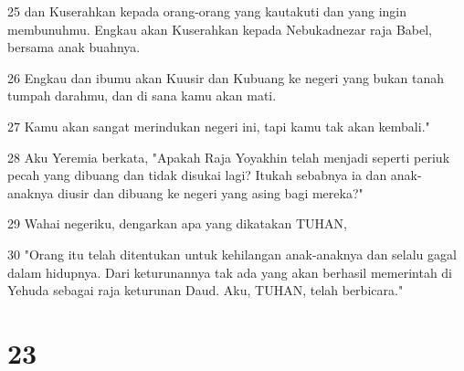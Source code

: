 \par 25 dan Kuserahkan kepada orang-orang yang kautakuti dan yang ingin membunuhmu. Engkau akan Kuserahkan kepada Nebukadnezar raja Babel, bersama anak buahnya.
\par 26 Engkau dan ibumu akan Kuusir dan Kubuang ke negeri yang bukan tanah tumpah darahmu, dan di sana kamu akan mati.
\par 27 Kamu akan sangat merindukan negeri ini, tapi kamu tak akan kembali."
\par 28 Aku Yeremia berkata, "Apakah Raja Yoyakhin telah menjadi seperti periuk pecah yang dibuang dan tidak disukai lagi? Itukah sebabnya ia dan anak-anaknya diusir dan dibuang ke negeri yang asing bagi mereka?"
\par 29 Wahai negeriku, dengarkan apa yang dikatakan TUHAN,
\par 30 "Orang itu telah ditentukan untuk kehilangan anak-anaknya dan selalu gagal dalam hidupnya. Dari keturunannya tak ada yang akan berhasil memerintah di Yehuda sebagai raja keturunan Daud. Aku, TUHAN, telah berbicara."

\chapter{23}

